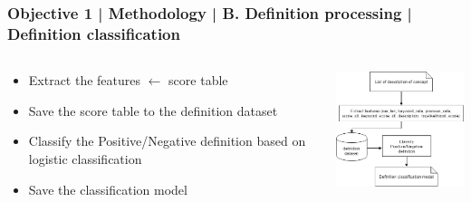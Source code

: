 \documentclass{beamer}
\begin{document}
\begin{frame}
\frametitle{Objective 1 | Methodology | B. Definition processing | Definition classification}
\begin{columns}

	\begin{column}{.55\textwidth}
		\begin{itemize}
			\item Extract the features $\leftarrow$ score table
			\item Save the score table to the definition dataset
			\item Classify the Positive/Negative definition based on logistic classification
			\item Save the classification model
		\end{itemize}
	
	\end{column}
	\begin{column}{.55\textwidth}
	\includegraphics[width=50mm]{dc3.png}
\end{column}
	
	
\end{columns}
\end{frame}
\end{document}
